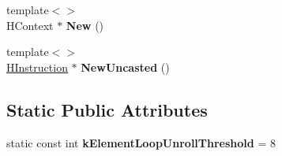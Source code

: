 \begin{DoxyCompactItemize}
\item 
\hypertarget{classv8_1_1internal_1_1_h_graph_builder_ac8364a11e55f6e0ad3bbfbf306ff25b9}{}{\footnotesize template$<$$>$ }\\H\+Context $\ast$ {\bfseries New} ()\label{classv8_1_1internal_1_1_h_graph_builder_ac8364a11e55f6e0ad3bbfbf306ff25b9}

\item 
\hypertarget{classv8_1_1internal_1_1_h_graph_builder_a8f467345daad17a88529f6a1747798f2}{}{\footnotesize template$<$$>$ }\\\hyperlink{classv8_1_1internal_1_1_h_instruction}{H\+Instruction} $\ast$ {\bfseries New\+Uncasted} ()\label{classv8_1_1internal_1_1_h_graph_builder_a8f467345daad17a88529f6a1747798f2}

\end{DoxyCompactItemize}
\subsection*{Static Public Attributes}
\begin{DoxyCompactItemize}
\item 
\hypertarget{classv8_1_1internal_1_1_h_graph_builder_a2b5563939eadafc67bca2eb265e8bbac}{}static const int {\bfseries k\+Element\+Loop\+Unroll\+Threshold} = 8\label{classv8_1_1internal_1_1_h_graph_builder_a2b5563939eadafc67bca2eb265e8bbac}

\end{DoxyCompactItemize}
